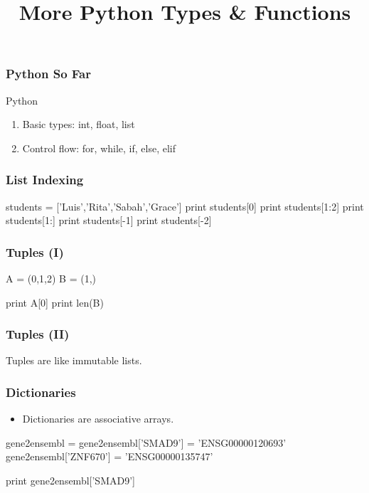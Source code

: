 
\title{More Python Types \& Functions}

\frame{\maketitle}

\begin{frame}[fragile]
\frametitle{Python So Far}

\begin{block}{Python}
\begin{enumerate}
\item Basic types: int, float, list
\item Control flow: for, while, if, else, elif
\end{enumerate}
\end{block}

\end{frame}

\begin{frame}[fragile]
\frametitle{List Indexing}

\begin{python}
students = ['Luis','Rita','Sabah','Grace']
print students[0]
print students[1:2]
print students[1:]
print students[-1]
print students[-2]
\end{python}
\end{frame}

\begin{frame}[fragile]
\frametitle{Tuples (I)}
\begin{python}
A = (0,1,2)
B = (1,)

print A[0]
print len(B)
\end{python}

\end{frame}

\begin{frame}[fragile]
\frametitle{Tuples (II)}
Tuples are like \alert{immutable} lists.
\end{frame}

\begin{frame}[fragile]
\frametitle{Dictionaries}

\begin{itemize}
\item Dictionaries are \alert{associative arrays}.
\end{itemize}

\begin{python}
gene2ensembl = {}
gene2ensembl['SMAD9'] = 'ENSG00000120693'
gene2ensembl['ZNF670'] = 'ENSG00000135747'

print gene2ensembl['SMAD9']
\end{python}
\end{frame}

